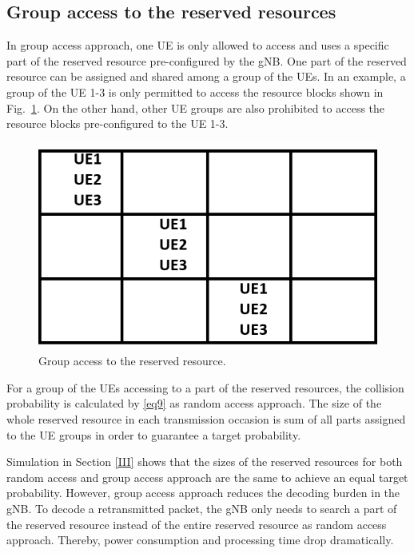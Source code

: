 \documentclass[conference]{IEEEtran}
\begin{document}
\subsection{Group access to the reserved resources}\label{IIEE}
In group access approach, one UE is only allowed to access and uses a specific part of the reserved resource pre-configured by the gNB. One part of the reserved resource can be assigned and shared among a group of the UEs. In an example, a group of the UE 1-3 is only permitted to access the resource blocks shown in Fig.~\ref{fig4}. On the other hand, other UE groups are also prohibited to access the resource blocks pre-configured to the UE 1-3. 

\begin{figure}[htbp]
\centerline{\includegraphics[scale=0.35]{fig4.png}}
\caption{Group access to the reserved resource.}
\label{fig4}
\end{figure}

For a group of the UEs accessing to a part of the reserved resources, the collision probability is calculated by \eqref{eq9} as random access approach. The size of the whole reserved resource in each transmission occasion is sum of all parts assigned to the UE groups in order to guarantee a target probability. 

Simulation in Section \ref{III} shows that the sizes of the reserved resources for both random access and group access approach are the same to achieve an equal target probability. However, group access approach reduces the decoding burden in the gNB. To decode a retransmitted packet, the gNB only needs to search a part of the reserved resource instead of the entire reserved resource as random access approach. Thereby, power consumption and processing time drop dramatically. 
\end{document}
